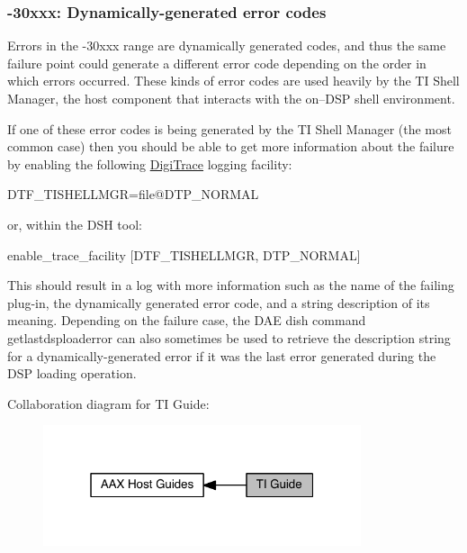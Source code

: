 \hypertarget{a00362_subsection__30xxx_dynamic_error_codes}{}\subsubsection{-\/30xxx\+: Dynamically-\/generated error codes}\label{a00362_subsection__30xxx_dynamic_error_codes}
 Errors in the -\/30xxx range are dynamically generated codes, and thus the same failure point could generate a different error code depending on the order in which errors occurred. These kinds of error codes are used heavily by the T\+I Shell Manager, the host component that interacts with the on–\+D\+S\+P shell environment.

If one of these error codes is being generated by the T\+I Shell Manager (the most common case) then you should be able to get more information about the failure by enabling the following \hyperlink{a00364}{Digi\+Trace} logging facility\+:

{\ttfamily D\+T\+F\+\_\+\+T\+I\+S\+H\+E\+L\+L\+M\+G\+R=file@D\+T\+P\+\_\+\+N\+O\+R\+M\+A\+L}

or, within the D\+S\+H tool\+:

{\ttfamily enable\+\_\+trace\+\_\+facility \mbox{[}D\+T\+F\+\_\+\+T\+I\+S\+H\+E\+L\+L\+M\+G\+R, D\+T\+P\+\_\+\+N\+O\+R\+M\+A\+L\mbox{]}}

This should result in a log with more information such as the name of the failing plug-\/in, the dynamically generated error code, and a string description of its meaning. Depending on the failure case, the D\+A\+E dish command {\ttfamily getlastdsploaderror} can also sometimes be used to retrieve the description string for a dynamically-\/generated error if it was the last error generated during the D\+S\+P loading operation.

 Collaboration diagram for T\+I Guide\+:
\nopagebreak
\begin{figure}[H]
\begin{center}
\leavevmode
\includegraphics[width=265pt]{a00362}
\end{center}
\end{figure}
